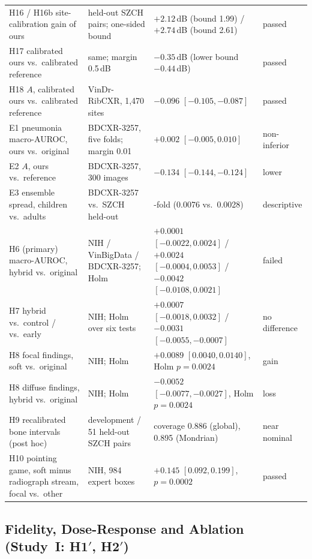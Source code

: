 \begin{table}[!t]
\begin{tabularx}{\textwidth}{@{}>{\raggedright\arraybackslash}p{4.3cm}>{\raggedright\arraybackslash}X%
>{\raggedright\arraybackslash}p{4.6cm}>{\raggedright\arraybackslash}p{2.3cm}@{}}
H16 / H16b site-calibration gain of ours & 51 held-out SZCH pairs; one-sided bound & $+2.12$\,dB (bound 1.99) / $+2.74$\,dB (bound 2.61)
 & passed \\
H17 calibrated ours vs.\ calibrated reference & same; margin 0.5\,dB & $-0.35$\,dB (lower bound $-0.44$\,dB) & passed \\
H18 $A$, calibrated ours vs.\ calibrated reference & VinDr-RibCXR, 1,470 sites & $-0.096$ $[-0.105,-0.087]$ & passed \\
E1 pneumonia macro-AUROC, ours vs.\ original & BDCXR-3257, five folds; margin 0.01 & $+0.002$ $[-0.005,0.010]$ & non-inferior \\
E2 $A$, ours vs.\ reference & BDCXR-3257, 300 images & $-0.134$ $[-0.144,-0.124]$ & lower \\
E3 ensemble spread, children vs.\ adults & BDCXR-3257 vs.\ SZCH held-out & 2.7-fold (0.0076 vs.\ 0.0028) & descriptive \\
\midrule
H6 (primary) macro-AUROC, hybrid vs.\ original & NIH / VinBigData / BDCXR-3257; Holm & $+0.0001$ $[-0.0022,0.0024]$ / $+0.0024$
 $[-0.0004,0.0053]$ / $-0.0042$ $[-0.0108,0.0021]$ & failed \\
H7 hybrid vs.\ control / vs.\ early & NIH; Holm over six tests & $+0.0007$ $[-0.0018,0.0032]$ / $-0.0031$ $[-0.0055,-0.0007]$ & no
 difference \\
H8 focal findings, soft vs.\ original & NIH; Holm & $+0.0089$ $[0.0040,0.0140]$, Holm $p=0.0024$ & gain \\
H8 diffuse findings, hybrid vs.\ original & NIH; Holm & $-0.0052$ $[-0.0077,-0.0027]$, Holm $p=0.0024$ & loss \\
H9 recalibrated bone intervals (post hoc) & 24 development / 51 held-out SZCH pairs & coverage 0.886 (global), 0.895 (Mondrian) & near
 nominal \\
H10 pointing game, soft minus radiograph stream, focal vs.\ other & NIH, 984 expert boxes & $+0.145$ $[0.092,0.199]$, $p=0.0002$ &
 passed \\
\bottomrule
\end{tabularx}
\end{table}

\subsection{Fidelity, Dose-Response and Ablation (Study~I: H1\texorpdfstring{$'$}{'}, H2\texorpdfstring{$'$}{'})}
\label{sec:res-fidelity}

